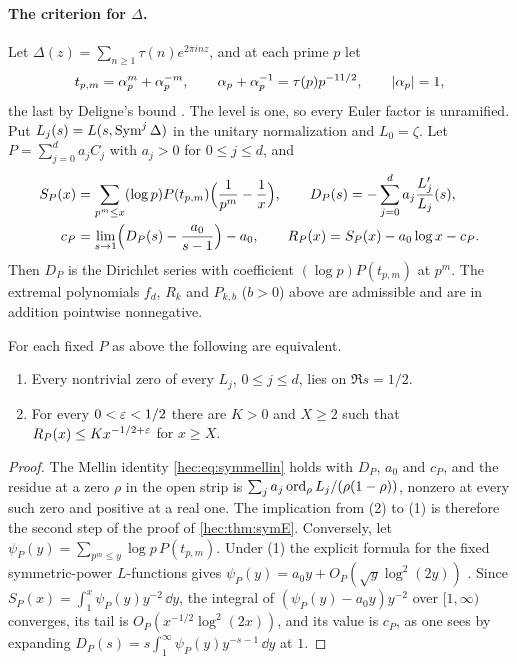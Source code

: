 \paragraph{The criterion for $\Delta$.}
Let $\Delta(z)=\sum_{n\ge1}\tau(n)e^{2\pi inz}$, and at each prime $p$ let
\[
 t_{p,m}=\alpha_p^m+\alpha_p^{-m},\qquad\alpha_p+\alpha_p^{-1}=\tau(p)p^{-11/2},\qquad\lvert\alpha_p\rvert=1,
\]
the last by Deligne's bound \cite{Deligne1974Weil}. The level is one, so every Euler factor is unramified.
Put $L_j(s)=L(s,\operatorname{Sym}^j\Delta)$ in the unitary normalization and $L_0=\zeta$. Let $P=\sum_{j=0}^da_jC_j$ with
$a_j>0$ for $0\le j\le d$, and
\begin{align*}
 S_P(x)&=\sum_{p^m\le x}(\log p)P(t_{p,m})\Bigl(\frac1{p^m}-\frac1x\Bigr),\qquad
 D_P(s)=-\sum_{j=0}^da_j\frac{L_j'}{L_j}(s),\\
 c_P&=\lim_{s\to1}\Bigl(D_P(s)-\frac{a_0}{s-1}\Bigr)-a_0,\qquad
 R_P(x)=S_P(x)-a_0\log x-c_P .
\end{align*}
Then $D_P$ is the Dirichlet series with coefficient $(\log p)P(t_{p,m})$ at $p^m$. The extremal
polynomials $f_d$, $R_k$ and $P_{k,b}$ ($b>0$) above are admissible and are in addition pointwise
nonnegative.

\begin{theorem}\label{hec:thm:symDelta}
For each fixed $P$ as above the following are equivalent.
\begin{enumerate}[label=\textup{(\arabic*)}]
\item Every nontrivial zero of every $L_j$, $0\le j\le d$, lies on $\Re s=1/2$.
\item For every $0<\varepsilon<1/2$ there are $K>0$ and $X\ge2$ such that $R_P(x)\le Kx^{-1/2+\varepsilon}$ for
$x\ge X$.
\end{enumerate}
\end{theorem}

\begin{proof}
The Mellin identity \eqref{hec:eq:symmellin} holds with $D_P$, $a_0$ and $c_P$, and the residue at a zero
$\rho$ in the open strip is $\sum_ja_j\operatorname{ord}_\rho L_j/(\rho(1-\rho))$, nonzero at every such zero and positive
at a real one. The implication from (2) to (1) is therefore the second step of the proof of
\cref{hec:thm:symE}. Conversely, let $\psi_P(y)=\sum_{p^m\le y}\log p\,P(t_{p,m})$. Under (1) the explicit
formula for the fixed symmetric-power $L$-functions gives $\psi_P(y)=a_0y+O_P(\sqrt y\log^2(2y))$
\cite{RouseThorner2017Explicit}. Since $S_P(x)=\int_1^x\psi_P(y)y^{-2}\,\dd y$, the integral of
$(\psi_P(y)-a_0y)y^{-2}$ over $[1,\infty)$ converges, its tail is $O_P(x^{-1/2}\log^2(2x))$, and its value
is $c_P$, as one sees by expanding $D_P(s)=s\int_1^\infty\psi_P(y)y^{-s-1}\,\dd y$ at $1$.
\end{proof}

